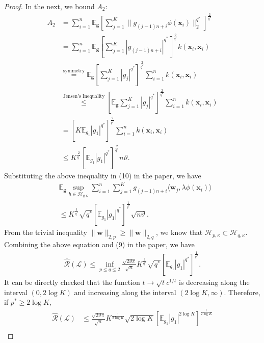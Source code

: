 \documentclass[10pt]{llncs}
\begin{document}
\begin{proof}
  In the next, we bound $A_2$:
  \begin{align*}
    A_2&=\sum_{i=1}^n\mathbb{E}_{\bm g}\left[\sum_{j=1}^K\|g_{(j-1)n+i}\phi(\mathbf x_i)\|_2^{q^\ast}\right]^{\frac{2}{q^\ast}}\\
    &=\sum_{i=1}^n\mathbb{E}_{\bm g}\left[\sum_{j=1}^K|g_{(j-1)n+i}|^{q^\ast}\right]^{\frac{2}{q^\ast}}k(\mathbf x_i,\mathbf x_i)\\
    &\overset{\text{symmetry}}{=}\mathbb{E}_{\bm g}\left[\sum_{j=1}^K|g_{j}|^{q^\ast}\right]^{\frac{2}{q^\ast}}\sum_{i=1}^nk(\mathbf x_i,\mathbf x_i)\\
    &\overset{\text{Jensen's Inequality}}{\leq}
    \left[\mathbb{E}_{\bm g} \sum_{j=1}^K|g_{j}|^{q^\ast}\right]^{\frac{2}{q^\ast}}\sum_{i=1}^nk(\mathbf x_i,\mathbf x_i)\\
    &=\left[K\mathbb{E}_{g_1}|g_1|^{q^\ast}\right]^{\frac{2}{q^\ast}}\sum_{i=1}^nk(\mathbf x_i,\mathbf x_i)\\
    &\leq K^{\frac{2}{q^\ast}}\left[\mathbb{E}_{g_1}|g_1|^{q^\ast}\right]^{\frac{2}{q^\ast}}n\vartheta.
  \end{align*}
  Substituting the above inequality in \textrm{(10)} in the paper, we have
  \begin{align*}
    &\mathbb{E}_{\bm g}\sup_{h\in \mathcal{H}_{q,\kappa}}\sum_{i=1}^n\sum_{j=1}^Kg_{(j-1)n+i}\langle \mathbf w_j,\lambda \phi(\mathbf x_i)\rangle\\
    &\leq  K^{\frac{1}{q^\ast}}\sqrt{q^\ast}\left[\mathbb{E}_{g_1}|g_1|^{q^\ast}\right]^\frac{1}{q^\ast}\sqrt{n\vartheta}.
  \end{align*}
  From the trivial inequality $\|\mathbf w\|_{2,p}\geq \|\mathbf w\|_{2,q}$,
  we know that $\mathcal{H}_{p,\kappa}\subset \mathcal{H}_{q,\kappa}$.
  Combining the above  equation and \textrm{(9)} in the paper,
  we have
  \begin{align*}
    \hat{\mathcal{R}}(\mathcal{L})\leq\inf_{p\leq q\leq 2}\frac{\sqrt{2\vartheta\pi}}{\sqrt{n}} K^{\frac{1}{q^\ast}}\sqrt{q^\ast}
    \left[\mathbb{E}_{g_1}|g_1|^{q^\ast}\right]^\frac{1}{q^\ast}.
  \end{align*}
  It can be directly checked that the function $t\rightarrow \sqrt{t}c^{1/t}$ is decreasing along the interval $(0,2\log K)$
  and increasing along the interval $(2\log K,\infty)$.
  Therefore, if $p^\ast\geq 2\log K$,
  \begin{align}
  \label{eq-hai}
    \nonumber\hat{\mathcal{R}}(\mathcal{L})&\leq \frac{\sqrt{2\vartheta\pi}}{\sqrt{n}} K^{\frac{1}{2\log K }}\sqrt{2\log K}
     \left[\mathbb{E}_{g_1}|g_1|^{2\log K}\right]^\frac{1}{2\log K}\\

\end{align}
\end{proof}
\end{document}
